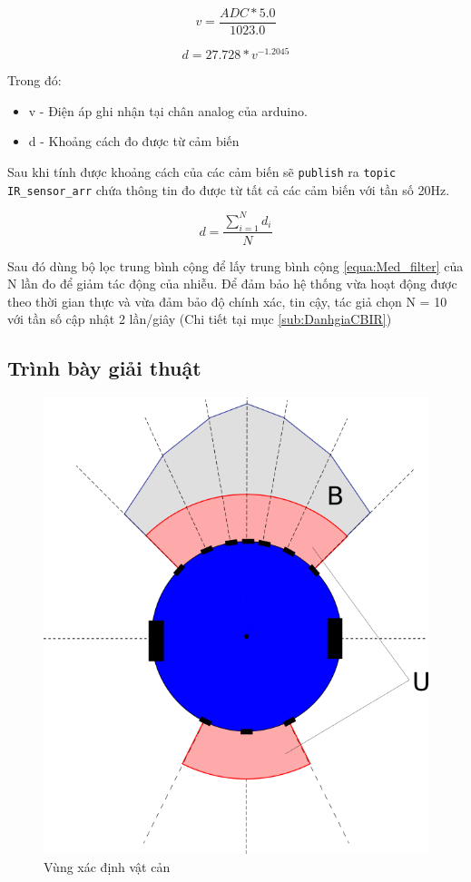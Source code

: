 \begin{equation}
    v = \frac{ADC * 5.0}{1023.0}
    \label{equa:ADC2Vol}
\end{equation}

\begin{equation}
    d = 27.728 * {v}^{-1.2045}
    \label{equa:Vol2Distance}
\end{equation}

Trong đó:
\begin{itemize}
    \item v - Điện áp ghi nhận tại chân analog của arduino.
    \item d - Khoảng cách đo được từ cảm biến
\end{itemize}

Sau khi tính được khoảng cách của các cảm biến sẽ {\tt publish} ra {\tt topic IR\_sensor\_arr} chứa thông tin đo được từ tất cả các cảm biến với tần số 20Hz.

\begin{equation}
    d = \frac{\sum_{i=1}^{N} d_i}{N}
    \label{equa:Med_filter}
\end{equation}

Sau đó dùng bộ lọc trung bình cộng để lấy trung bình cộng \ref{equa:Med_filter} của N lần đo để giảm tác động của nhiễu. Để đảm bảo hệ thống vừa hoạt động được theo thời gian thực và vừa đảm bảo độ chính xác, tin cậy, tác giả chọn N = 10 với tần số cập nhật 2 lần/giây (Chi tiết tại mục \ref{sub:DanhgiaCBIR})

\subsection{Trình bày giải thuật}

\begin{figure}[htbp]
    \centering
    \includegraphics[width=0.5\linewidth]{figures/arg_obstacle-detection-area.png}
    \caption{Vùng xác định vật cản}
    \label{fig:arg-obstacle-area}
\end{figure}

